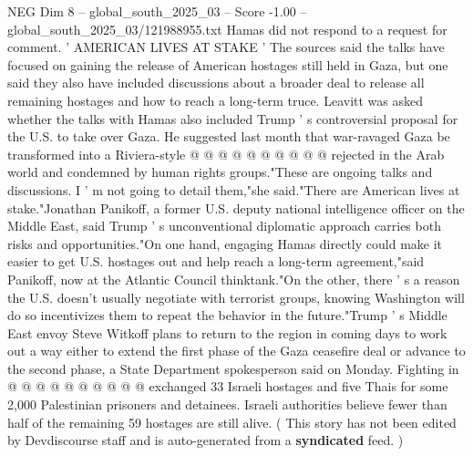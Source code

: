 \begin{textsample}{NEG Dim 8 – global\_south\_2025\_03 – Score -1.00 – global\_south\_2025\_03/121988955.txt}
Hamas did not respond to a request for comment. ' AMERICAN LIVES AT STAKE ' The sources said the talks have focused on gaining the release of American hostages still held in Gaza, but one said they also have included discussions about a broader deal to release all remaining hostages and how to reach a long-term truce.
Leavitt was asked whether the talks with Hamas also included Trump ' s controversial proposal for the U.S. to take over Gaza.
He suggested last month that war-ravaged Gaza be transformed into a Riviera-style @ @ @ @ @ @ @ @ @ @ rejected in the Arab world and condemned by human rights groups."These are ongoing talks and discussions.
I ' m not going to detail them,"she said."There are American lives at stake."Jonathan Panikoff, a former U.S. deputy national intelligence officer on the Middle East, said Trump ' s unconventional diplomatic approach carries both risks and opportunities."On one hand, engaging Hamas directly could make it easier to get U.S. hostages out and help reach a long-term agreement,"said Panikoff, now at the Atlantic Council thinktank."On the other, there ' s a reason the U.S. doesn't usually negotiate with terrorist groups, knowing Washington will do so incentivizes them to repeat the behavior in the future."Trump ' s Middle East envoy Steve Witkoff plans to return to the region in coming days to work out a way either to extend the first phase of the Gaza ceasefire deal or advance to the second phase, a State Department spokesperson said on Monday.
Fighting in @ @ @ @ @ @ @ @ @ @ exchanged 33 Israeli hostages and five Thais for some 2,000 Palestinian prisoners and detainees.
Israeli authorities believe fewer than half of the remaining 59 hostages are still alive. ( This story has not been edited by Devdiscourse staff and is auto-generated from a \textbf{syndicated} feed. )

\end{textsample}
